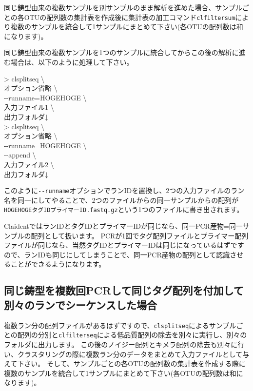 \documentclass[titlepage,10pt,a4paper]{jsbook}
\newenvironment{cmd}{\begin{oframed}\raggedright\ttfamily\footnotesize\setlength{\baselineskip}{1.4em}}{\end{oframed}\vspace{-1em}}
\begin{document}
同じ鋳型由来の複数サンプルを別サンプルのまま解析を進めた場合、サンプルごとの各OTUの配列数の集計表を作成後に集計表の加工コマンド\texttt{clfiltersum}により複数のサンプルを統合して1サンプルにまとめて下さい(各OTUの配列数は和になります)。

同じ鋳型由来の複数サンプルを1つのサンプルに統合してからこの後の解析に進む場合は、以下のように処理して下さい。
\begin{cmd}
{\textgreater} clsplitseq {\textbackslash}\\
オプション省略 {\textbackslash}\\
{-}{-}runname=HOGEHOGE {\textbackslash}\\
入力ファイル1 {\textbackslash}\\
出力フォルダ↓\\
{\textgreater} clsplitseq {\textbackslash}\\
オプション省略 {\textbackslash}\\
{-}{-}runname=HOGEHOGE {\textbackslash}\\
{-}{-}append {\textbackslash}\\
入力ファイル2 {\textbackslash}\\
出力フォルダ↓
\end{cmd}
このように\texttt{{-}{-}runname}オプションでランIDを置換し、2つの入力ファイルのラン名を同一にしてやることで、2つのファイルからの同一サンプルからの配列が\texttt{HOGEHOGE{\textunderscore}{\textunderscore}タグID{\textunderscore}{\textunderscore}プライマーID.fastq.gz}という1つのファイルに書き出されます。

ClaidentではランIDとタグIDとプライマーIDが同じなら、同一PCR産物=同一サンプルの配列として扱います。
PCRが1回でタグ配列ファイルとプライマー配列ファイルが同じなら、当然タグIDとプライマーIDは同じになっているはずですので、ランIDも同じにしてしまうことで、同一PCR産物の配列として認識させることができるようになります。

\subsection{同じ鋳型を複数回PCRして同じタグ配列を付加して別々のランでシーケンスした場合}

複数ラン分の配列ファイルがあるはずですので、\texttt{clsplitseq}によるサンプルごとの配列の分別と\texttt{clfilterseq}による低品質配列の除去を別々に実行し、別々のフォルダに出力します。
この後のノイジー配列とキメラ配列の除去も別々に行い、クラスタリングの際に複数ラン分のデータをまとめて入力ファイルとして与えて下さい。
そして、サンプルごとの各OTUの配列数の集計表を作成する際に複数のサンプルを統合して1サンプルにまとめて下さい(各OTUの配列数は和になります)。
\end{document}
